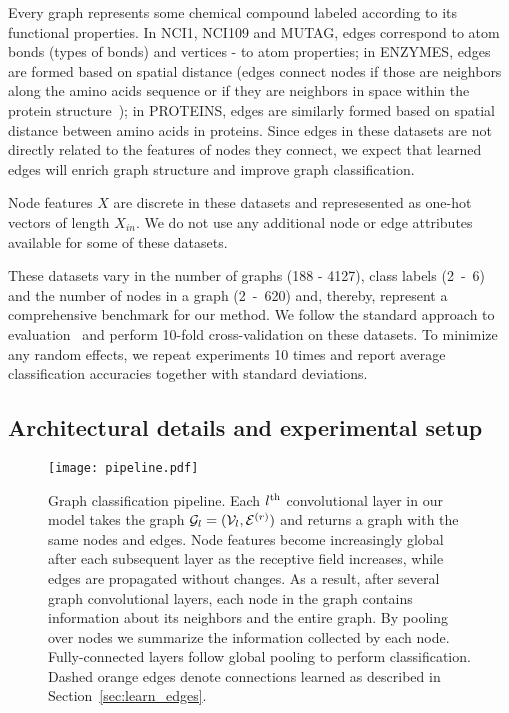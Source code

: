 \documentclass[final,nonatbib]{article} \usepackage{nips_2018}
\begin{document}
	Every graph represents some chemical compound labeled according to its functional properties.
	In NCI1, NCI109 and MUTAG, edges correspond to atom bonds (types of bonds) and vertices - to atom properties;	in ENZYMES, edges are formed based on spatial distance (edges connect nodes if those are neighbors along the amino acids sequence or if they are neighbors in space within the protein structure~\cite{borgwardt2005protein}); in PROTEINS, edges are similarly formed based on spatial distance between amino acids in proteins. Since edges in these datasets are not directly related to the features of nodes they connect, we expect that learned edges will enrich graph structure and improve graph classification.

	Node features $X$ are discrete in these datasets and represesented as one-hot vectors of length $X_{in}$. We do not use any additional node or edge attributes available for some of these datasets.

	These datasets vary in the number of graphs (188 - 4127), class labels (2~-~6) and the number of nodes in a graph (2~-~620) and, thereby, represent a comprehensive benchmark for our method. We follow the standard approach to evaluation~\cite{shervashidze2011weisfeiler,yanardag2015deep} and perform 10-fold cross-validation on these datasets. To minimize any random effects, we repeat experiments 10 times and report average classification accuracies together with standard deviations.

	\subsection{Architectural details and experimental setup}
	\begin{figure}[]
		\begin{center}
			\texttt{[image: pipeline.pdf]}
		\end{center}
		\caption{Graph classification pipeline. Each $l\textsuperscript{th}$ convolutional layer in our model takes the graph ${\cal G}_l = ({\cal V}_l, {\cal E}^{(r)})$ and returns a graph with the same nodes and edges. Node features become increasingly global after each subsequent layer as the receptive field increases, while edges are propagated without changes. As a result, after several graph convolutional layers, each node in the graph contains information about its neighbors and the entire graph. By pooling over nodes we summarize the information collected by each node. Fully-connected layers follow global pooling to perform classification. Dashed orange edges denote connections learned as described in Section~\ref{sec:learn_edges}.
		}
		\label{fig:pipeline}
	\end{figure}
\end{document}
